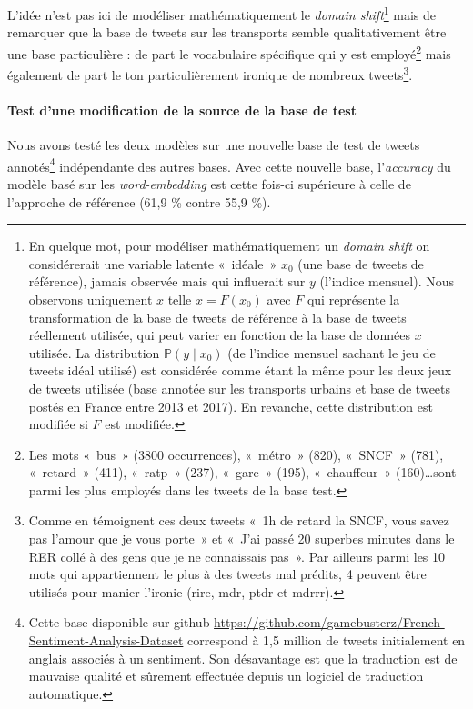 \documentclass[11pt,french,french]{article}
\let\rmarkdownfootnote\footnote%
\def\footnote{\protect\rmarkdownfootnote}
\begin{document}
L'idée n'est pas ici de modéliser mathématiquement le \emph{domain
shift}\footnote{En quelque mot, pour modéliser mathématiquement un
  \emph{domain shift} on considérerait une variable latente «~idéale~»
  \(x_0\) (une base de tweets de référence), jamais observée mais qui
  influerait sur \(y\) (l'indice mensuel). Nous observons uniquement
  \(x\) telle \(x=F(x_0)\) avec \(F\) qui représente la transformation
  de la base de tweets de référence à la base de tweets réellement
  utilisée, qui peut varier en fonction de la base de données \(x\)
  utilisée. La distribution \(\mathbb P(y\mid x_0)\) (de l'indice
  mensuel sachant le jeu de tweets idéal utilisé) est considérée comme
  étant la même pour les deux jeux de tweets utilisée (base annotée sur
  les transports urbains et base de tweets postés en France entre 2013
  et 2017). En revanche, cette distribution est modifiée si \(F\) est
  modifiée.} mais de remarquer que la base de tweets sur les transports
semble qualitativement être une base particulière : de part le
vocabulaire spécifique qui y est employé\footnote{Les mots «~bus~» (3800
  occurrences), «~métro~» (820), «~SNCF~» (781), «~retard~» (411),
  «~ratp~» (237), «~gare~» (195), «~chauffeur~» (160)\dots sont parmi
  les plus employés dans les tweets de la base test.} mais également de
part le ton particulièrement ironique de nombreux tweets\footnote{Comme
  en témoignent ces deux tweets «~1h de retard la SNCF, vous savez pas
  l'amour que je vous porte~» et «~J'ai passé 20 superbes minutes dans
  le RER collé à des gens que je ne connaissais pas~». Par ailleurs
  parmi les 10 mots qui appartiennent le plus à des tweets mal prédits,
  4 peuvent être utilisés pour manier l'ironie (rire, mdr, ptdr et
  mdrrr).}.

\paragraph{Test d'une modification de la source de la base de
test}\label{subsec:basegit}

Nous avons testé les deux modèles sur une nouvelle base de test de
tweets annotés\footnote{Cette base disponible sur github
  \url{https://github.com/gamebusterz/French-Sentiment-Analysis-Dataset}
  correspond à 1,5 million de tweets initialement en anglais associés à
  un sentiment. Son désavantage est que la traduction est de mauvaise
  qualité et sûrement effectuée depuis un logiciel de traduction
  automatique.} indépendante des autres bases. Avec cette nouvelle base,
l'\emph{accuracy} du modèle basé sur les \emph{word-embedding} est cette
fois-ci supérieure à celle de l'approche de référence (61,9 \% contre
55,9 \%).
\end{document}
